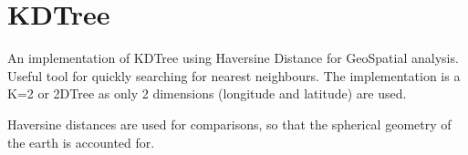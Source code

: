 \documentclass[letterpaper,10pt,english]{sphinxmanual}
\begin{document}

\section{KDTree}
\label{\detokenize{users_guide:kdtree}}\label{\detokenize{users_guide:module-GeoSpatialTools.kdtree}}
\sphinxAtStartPar
An implementation of KDTree using Haversine Distance for GeoSpatial analysis.
Useful tool for quickly searching for nearest neighbours. The implementation is
a K=2 or 2DTree as only 2 dimensions (longitude and latitude) are used.

\sphinxAtStartPar
Haversine distances are used for comparisons, so that the spherical geometry
of the earth is accounted for.
\end{document}

